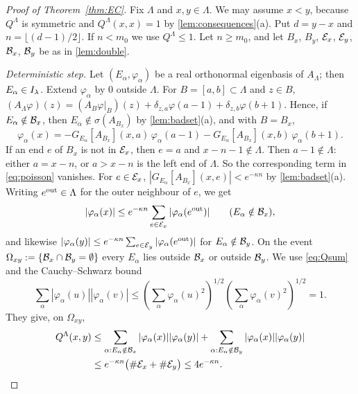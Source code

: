\begin{proof}[Proof of Theorem~\ref{thm:EC}]
Fix $\Lambda$ and $x,y\in\Lambda$.  We may assume $x<y$, because $Q^\Lambda$ is symmetric and
$Q^\Lambda(x,x)=1$ by \cref{lem:consequences}(a).  Put $d=y-x$ and $n=\lfloor(d-1)/2\rfloor$.  If
$n<m_0$ we use $Q^\Lambda\le1$.  Let $n\ge m_0$, and let $B_x$, $B_y$, $\mathcal{E}_x$, $\mathcal{E}_y$, $\mathcal{B}_x$,
$\mathcal{B}_y$ be as in \cref{lem:double}.

\emph{Deterministic step.}  Let $(E_\alpha,\varphi_\alpha)$ be a real orthonormal eigenbasis of $A_\Lambda$; then
$E_\alpha\in I_\lambda$.  Extend $\varphi_\alpha$ by $0$ outside $\Lambda$.  For $B=[a,b]\subset\Lambda$ and $z\in B$,
$(A_\Lambda\varphi)(z)=(A_B\varphi|_B)(z)+\delta_{z,a}\varphi(a-1)+\delta_{z,b}\varphi(b+1)$.  Hence, if
$E_\alpha\notin\mathcal{B}_x$, then $E_\alpha\notin\sigma(A_{B_x})$ by \cref{lem:badset}(a), and with $B=B_x$,
\begin{equation}\label{eq:poisson}
  \varphi_\alpha(x)=-G_{E_\alpha}[A_{B_x}](x,a)\,\varphi_\alpha(a-1)-G_{E_\alpha}[A_{B_x}](x,b)\,\varphi_\alpha(b+1).
\end{equation}
If an end $e$ of $B_x$ is not in $\mathcal{E}_x$, then $e=a$ and $x-n-1\notin\Lambda$.  Then $a-1\notin\Lambda$:
either $a=x-n$, or $a>x-n$ is the left end of $\Lambda$.  So the corresponding term in \eqref{eq:poisson}
vanishes.  For $e\in\mathcal{E}_x$, $|G_{E_\alpha}[A_{B_x}](x,e)|<e^{-\kappa n}$ by \cref{lem:badset}(a).  Writing
$e^{\rm out}\in\Lambda$ for the outer neighbour of $e$, we get
\[
  |\varphi_\alpha(x)|\le e^{-\kappa n}\sum_{e\in\mathcal{E}_x}|\varphi_\alpha(e^{\rm out})|\qquad(E_\alpha\notin\mathcal{B}_x),
\]
and likewise $|\varphi_\alpha(y)|\le e^{-\kappa n}\sum_{e\in\mathcal{E}_y}|\varphi_\alpha(e^{\rm out})|$ for $E_\alpha\notin\mathcal{B}_y$.
On the event $\Omega_{xy}:=\{\mathcal{B}_x\cap\mathcal{B}_y=\emptyset\}$ every $E_\alpha$ lies outside $\mathcal{B}_x$ or outside
$\mathcal{B}_y$.  We use \eqref{eq:Qsum} and the Cauchy--Schwarz bound
\[
  \textstyle\sum_\alpha|\varphi_\alpha(u)||\varphi_\alpha(v)|\le(\sum_\alpha\varphi_\alpha(u)^2)^{1/2}(\sum_\alpha\varphi_\alpha(v)^2)^{1/2}=1 .
\]
They give, on $\Omega_{xy}$,
\begin{equation}\label{eq:Qgood}
\begin{split}
  Q^\Lambda(x,y)&\le\sum_{\alpha:E_\alpha\notin\mathcal{B}_x}|\varphi_\alpha(x)||\varphi_\alpha(y)|+\sum_{\alpha:E_\alpha\notin\mathcal{B}_y}|\varphi_\alpha(x)||\varphi_\alpha(y)|\\
  &\le e^{-\kappa n}\bigl(\#\mathcal{E}_x+\#\mathcal{E}_y\bigr)\le4e^{-\kappa n}.
\end{split}
\end{equation}


\end{proof}
